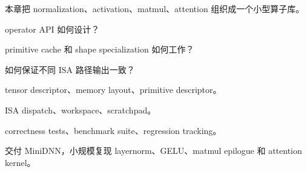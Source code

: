 {本章把 normalization、activation、matmul、attention 组织成一个小型算子库。}
{\item operator API 如何设计？
\item primitive cache 和 shape specialization 如何工作？
\item 如何保证不同 ISA 路径输出一致？}
{\item tensor descriptor、memory layout、primitive descriptor。
\item ISA dispatch、workspace、scratchpad。
\item correctness tests、benchmark suite、regression tracking。}
{交付 MiniDNN，小规模复现 layernorm、GELU、matmul epilogue 和 attention kernel。}
